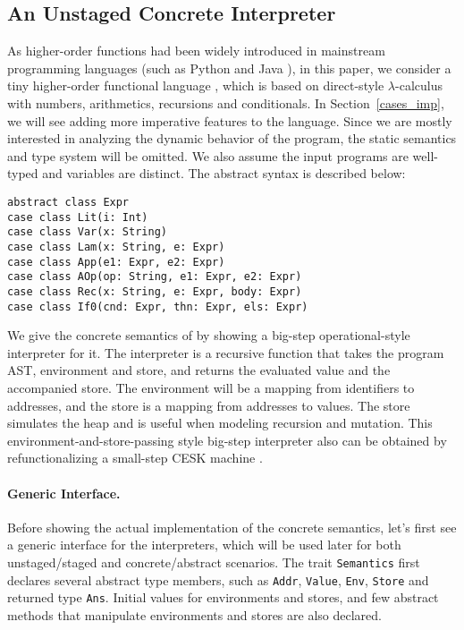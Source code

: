 \subsection{An Unstaged Concrete Interpreter} \label{bg_lang}

As higher-order functions had been widely introduced in mainstream programming languages (such as Python and Java ), 
in this paper, we consider a tiny higher-order functional language \TLang, which is based on direct-style $\lambda$-calculus
with numbers, arithmetics, recursions and conditionals.
In Section~\ref{cases_imp}, we will see adding more imperative features to the language.
Since we are mostly interested in analyzing the dynamic behavior of the program, the static semantics and
type system will be omitted. We also assume the input programs are well-typed and variables are distinct.
The abstract syntax is described below:

\begin{lstlisting}
abstract class Expr
case class Lit(i: Int)
case class Var(x: String)
case class Lam(x: String, e: Expr)
case class App(e1: Expr, e2: Expr)
case class AOp(op: String, e1: Expr, e2: Expr)
case class Rec(x: String, e: Expr, body: Expr)
case class If0(cnd: Expr, thn: Expr, els: Expr)
\end{lstlisting}

We give the concrete semantics of \TLang by showing a big-step operational-style interpreter for it.
The interpreter is a recursive function that takes the program AST, environment and store, and returns 
the evaluated value and the accompanied store. The environment will be a mapping from identifiers to addresses,
and the store is a mapping from addresses to values. The store simulates the heap and is useful when modeling 
recursion and mutation.
This environment-and-store-passing style big-step interpreter also can be obtained by 
refunctionalizing \cite{DBLP:conf/ppdp/AgerBDM03, Wei:2018:RAA:3243631.3236800} a small-step CESK 
machine \cite{DBLP:conf/popl/FelleisenF87}.

\paragraph{Generic Interface.} 
Before showing the actual implementation of the concrete semantics, let's first see 
a generic interface for the interpreters, which will be used later for both unstaged/staged and concrete/abstract scenarios.
The trait \texttt{Semantics} first declares several abstract type members, such as \texttt{Addr},
\texttt{Value}, \texttt{Env}, \texttt{Store} and returned type \texttt{Ans}. 
Initial values for environments and stores, and few abstract methods that manipulate environments and stores are also declared.

